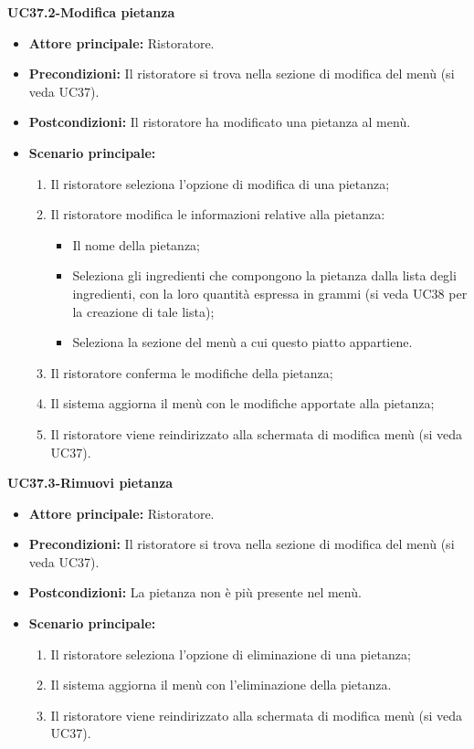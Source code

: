 \textbf{UC37.2-Modifica pietanza}
\begin{itemize}
    \item \textbf{Attore principale:} Ristoratore.
    \item \textbf{Precondizioni:} Il ristoratore si trova nella sezione di modifica del menù (si veda UC37).
    \item \textbf{Postcondizioni:} Il ristoratore ha modificato una pietanza al menù.
    \item \textbf{Scenario principale:}
    \begin{enumerate}
        \item Il ristoratore seleziona l'opzione di modifica di una pietanza;
        \item Il ristoratore modifica le informazioni relative alla pietanza:
        \begin{itemize}
            \item Il nome della pietanza;
            \item Seleziona gli ingredienti che compongono la pietanza dalla lista degli ingredienti, con la loro quantità espressa in grammi (si veda UC38 per la creazione di tale lista);
            \item Seleziona la sezione del menù a cui questo piatto appartiene.
        \end{itemize}
        \item Il ristoratore conferma le modifiche della pietanza;
        \item Il sistema aggiorna il menù con le modifiche apportate alla pietanza;
        \item Il ristoratore viene reindirizzato alla schermata di modifica menù (si veda UC37).
    \end{enumerate}
\end{itemize}

\textbf{UC37.3-Rimuovi pietanza}
\begin{itemize}
    \item \textbf{Attore principale:} Ristoratore.
    \item \textbf{Precondizioni:} Il ristoratore si trova nella sezione di modifica del menù (si veda UC37).
    \item \textbf{Postcondizioni:} La pietanza non è più presente nel menù.
    \item \textbf{Scenario principale:}
    \begin{enumerate}
        \item Il ristoratore seleziona l'opzione di eliminazione di una pietanza;
        \item Il sistema aggiorna il menù con l'eliminazione della pietanza.
        \item Il ristoratore viene reindirizzato alla schermata di modifica menù (si veda UC37).
    \end{enumerate}
\end{itemize}


